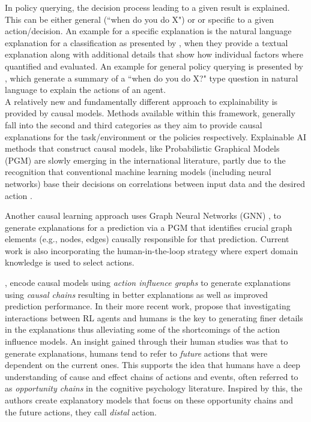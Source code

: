 \documentclass[twoside,11pt]{article}
\begin{document}
In policy querying, the decision process leading to a given result is explained. This can be either general (``when do you do X") or or specific to a given action/decision.
An example for a specific explanation is the natural language explanation for a classification as presented by \citep{AlonsoEtAl:2018:xAINLBeerClassifier}, when they provide a textual explanation along with additional details that show how individual factors where quantified and evaluated.
An example for general policy querying is presented by \citep{HayesShah:2017:AutonomousPolicyExplanation}, which generate a summary of a ``when do you do X?" type question in natural language to explain the actions of an agent. \\



A relatively new and fundamentally different approach to explainability is provided by causal models. Methods available within this framework, generally fall into the second and third categories as they aim to provide causal explanations for the task/environment or the policies respectively. Explainable AI methods that construct causal models, like Probabilistic Graphical Models (PGM) \citep{Koller:2009:ProbabilisticGraphicalModelsBook, Saranti:2019:LearningCompetencePGMs} are slowly emerging in the international literature, 
partly due to the recognition that conventional machine learning models (including neural networks) base their decisions on correlations between input data and the desired action  \citep{Lapuschkin:2019:UnmaskingCleverHans}. 

Another causal learning approach uses Graph Neural Networks (GNN) \citep{Vu:2020:PGMExplainer}, to generate explanations for a prediction via a PGM that identifies crucial graph elements (e.g., nodes, edges) causally responsible for that prediction. Current work is also incorporating the human-in-the-loop strategy \citep{HolzingerEtAl:2016:iMLExperiment, Holzinger:2019:HumanLoopAPIN} where expert domain knowledge is used to select actions. 

\citet{MadumalEtAl:2020:CausalRLCFs}, encode causal models using \emph{action influence graphs} to generate explanations using \emph{causal chains} resulting in better explanations as well as improved prediction performance. In their more recent work, \citet{Madumal:2020:DistalEF} propose that investigating interactions between RL agents and humans is the key to generating finer details in the explanations thus alleviating some of the shortcomings of the action influence models. An insight gained through their human studies was that to generate explanations, humans tend to refer to \emph{future} actions that were dependent on the current ones. This supports the idea that humans have a deep understanding of cause and effect chains of actions and events, often referred to as \emph{opportunity chains} in the cognitive psychology literature. Inspired by this, the authors create explanatory models that focus on these opportunity chains and the future actions, they call \emph{distal} action. 
\end{document}
